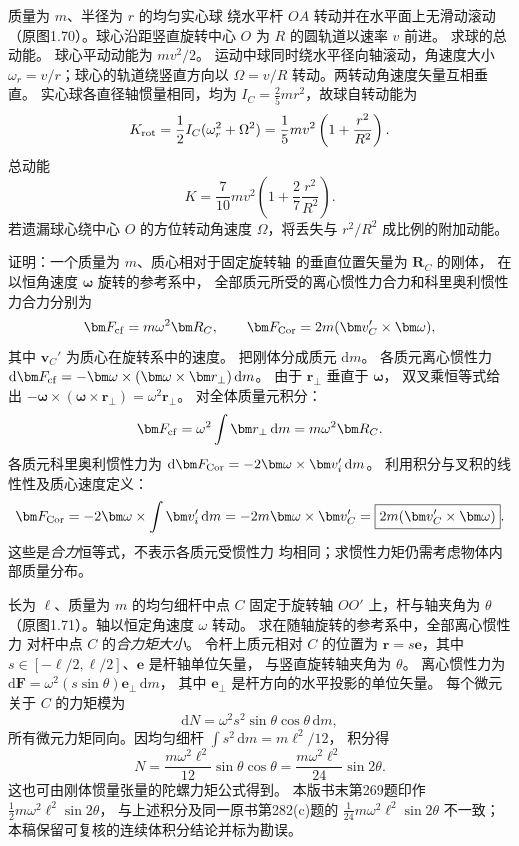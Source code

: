 质量为 $m$、半径为 $r$ 的均匀实心球
绕水平杆 $OA$ 转动并在水平面上无滑动滚动
（原图1.70）。球心沿距竖直旋转中心 $O$
为 $R$ 的圆轨道以速率 $v$ 前进。
求球的总动能。
\exsolution
球心平动动能为 $mv^2/2$。
运动中球同时绕水平径向轴滚动，角速度大小
$\omega_r=v/r$；球心的轨道绕竖直方向以
$\Omega=v/R$ 转动。两转动角速度矢量互相垂直。
实心球各直径轴惯量相同，均为
$I_C=\frac25mr^2$，故球自转动能为
\[
K_{\rm rot}=\frac12I_C(\omega_r^2+\Omega^2)
=\frac15m v^2\left(1+\frac{r^2}{R^2}\right).
\]
总动能
\[
\boxed{K=\frac7{10}mv^2\left(1+\frac27\frac{r^2}{R^2}\right)}.
\]
\excheck 若遗漏球心绕中心 $O$ 的方位转动角速度
$\Omega$，将丢失与 $r^2/R^2$ 成比例的附加动能。

证明：一个质量为 $m$、质心相对于固定旋转轴
的垂直位置矢量为 $\bm R_C$ 的刚体，
在以恒角速度 $\bm\omega$ 旋转的参考系中，
全部质元所受的离心惯性力合力和科里奥利惯性力合力分别为
\[
\bm F_{\rm cf}=m\omega^2\bm R_C,\qquad
\bm F_{\rm Cor}=2m(\bm v_C'\times\bm\omega),
\]
其中 $\bm v_C'$ 为质心在旋转系中的速度。
\exsolution
把刚体分成质元 $\mathrm dm$。
各质元离心惯性力
$\mathrm d\bm F_{\rm cf}
=-\bm\omega\times(\bm\omega\times\bm r_\perp)
\,\mathrm dm$。
由于 $\bm r_\perp$ 垂直于 $\bm\omega$，
双叉乘恒等式给出
$-\bm\omega\times(\bm\omega\times\bm r_\perp)
=\omega^2\bm r_\perp$。
对全体质量元积分：
\[
\bm F_{\rm cf}
=\omega^2\int\bm r_\perp\,\mathrm dm
=m\omega^2\bm R_C.
\]
各质元科里奥利惯性力为
$\mathrm d\bm F_{\rm Cor}
=-2\bm\omega\times\bm v_i'\,\mathrm dm$。
利用积分与叉积的线性性及质心速度定义：
\[
\bm F_{\rm Cor}=-2\bm\omega\times
\int\bm v_i'\,\mathrm dm
=-2m\bm\omega\times\bm v_C'
=\boxed{2m(\bm v_C'\times\bm\omega)}.
\]
\excheck 这些是\emph{合力}恒等式，不表示各质元受惯性力
均相同；求惯性力矩仍需考虑物体内部质量分布。

长为 $\ell$、质量为 $m$ 的均匀细杆中点 $C$
固定于旋转轴 $OO'$ 上，杆与轴夹角为 $\theta$
（原图1.71）。轴以恒定角速度 $\omega$ 转动。
求在随轴旋转的参考系中，全部离心惯性力
对杆中点 $C$ 的\emph{合力矩大小}。
\exsolution
令杆上质元相对 $C$ 的位置为
$\bm r=s\bm e$，其中
$s\in[-\ell/2,\ell/2]$、$\bm e$ 是杆轴单位矢量，
与竖直旋转轴夹角为 $\theta$。
离心惯性力为
$\mathrm d\bm F=\omega^2(s\sin\theta)
\bm e_\perp\,\mathrm dm$，
其中 $\bm e_\perp$ 是杆方向的水平投影的单位矢量。
每个微元关于 $C$ 的力矩模为
\[
\mathrm dN
=\omega^2s^2\sin\theta\cos\theta\,\mathrm dm,
\]
所有微元力矩同向。因均匀细杆
$\int s^2\,\mathrm dm=m\ell^2/12$，
积分得
\[
\boxed{N=\frac{m\omega^2\ell^2}{12}
\sin\theta\cos\theta
=\frac{m\omega^2\ell^2}{24}\sin2\theta}.
\]
\excheck 这也可由刚体惯量张量的陀螺力矩公式得到。
本版书末第269题印作 $\frac12m\omega^2\ell^2\sin2\theta$，
与上述积分及同一原书第282(c)题的
$\frac1{24}m\omega^2\ell^2\sin2\theta$ 不一致；
本稿保留可复核的连续体积分结论并标为勘误。

